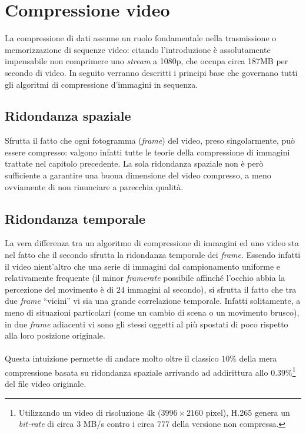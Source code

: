 \section{Compressione video}

La compressione di dati assume un ruolo fondamentale nella trasmissione o 
memorizzazione di sequenze video: citando l'introduzione è assolutamente 
impensabile non comprimere uno \emph{stream} a 1080p, che occupa circa 187MB 
per secondo di video. In seguito verranno descritti i principi base che 
governano tutti gli algoritmi di compressione d'immagini in sequenza.


\subsection{Ridondanza spaziale}

Sfrutta il fatto che ogni fotogramma (\emph{frame}) del video, preso
singolarmente, può essere compresso: valgono infatti tutte le teorie della 
compressione di immagini trattate nel capitolo precedente.
La sola ridondanza spaziale non è però sufficiente a garantire una buona 
dimensione del video compresso, a meno ovviamente di non rinunciare a parecchia 
qualità.


\subsection{Ridondanza temporale}

La vera differenza tra un algoritmo di compressione di immagini ed uno video 
sta nel fatto che il secondo sfrutta la ridondanza temporale dei \emph{frame}. 
Essendo infatti il video nient'altro che una serie di immagini dal  
campionamento uniforme e relativamente frequente (il minor \emph{framerate} 
possibile affinché 
l'occhio abbia la 
percezione del movimento è di $24$ immagini al secondo), si sfrutta il fatto 
che 
tra due \emph{frame} %
 ``vicini'' vi sia una grande correlazione temporale. 
Infatti solitamente, a meno di situazioni particolari (come un cambio di scena 
o un movimento brusco), in due \emph{frame} adiacenti vi sono gli stessi oggetti
al più spostati di poco rispetto alla loro posizione originale.
\\ \\ %
Questa intuizione permette di andare molto oltre il classico $10\%$ della mera 
compressione basata su ridondanza spaziale arrivando ad addirittura allo 
$0.39\%$\footnote{Utilizzando un video di risoluzione 4k ($3996\times2160$ 
pixel), H.265 genera un \emph{bit-rate} di circa $3$ MB/s contro i circa $777$ 
della versione non compressa.} del file video originale. 


